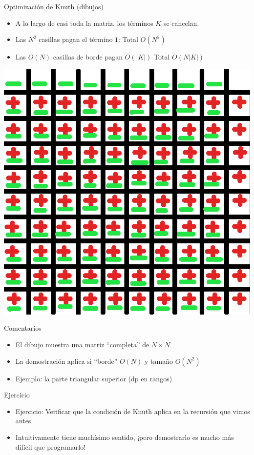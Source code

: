 \documentclass{beamer}
\begin{document}
\begin{frame}{Optimización de Knuth (dibujos)}
    \begin{itemize}
		\item A lo largo de casi toda la matriz, los términos $K$ se cancelan.
        \item Las $N^2$ casillas pagan el término $1$: Total $O(N^2)$
        \item Las $O(N)$ casillas de borde pagan $O(|K|)$ Total $O(N|K|)$
    \end{itemize}
    {\hfill \includegraphics[scale=0.16]{grilla-cancelacion.png}\hfill }
\end{frame}

\begin{frame}{Comentarios}
    \begin{itemize}
        \item El dibujo muestra una matriz ``completa'' de $N \times N$
        \item La demostración aplica si ``borde'' $O(N)$ y tamaño $O(N^2)$
        \item Ejemplo: la parte triangular superior (dp en rangos)
    \end{itemize}
\end{frame}



\begin{frame}{Ejercicio}
    \begin{itemize}
		\item Ejercicio: Verificar que la condición de Knuth aplica en la recursión que vimos antes 
		\item Intuitivamente tiene muchísimo sentido, ¡pero demostrarlo es mucho más difícil que programarlo!
    \end{itemize}
\end{frame}
\end{document}
